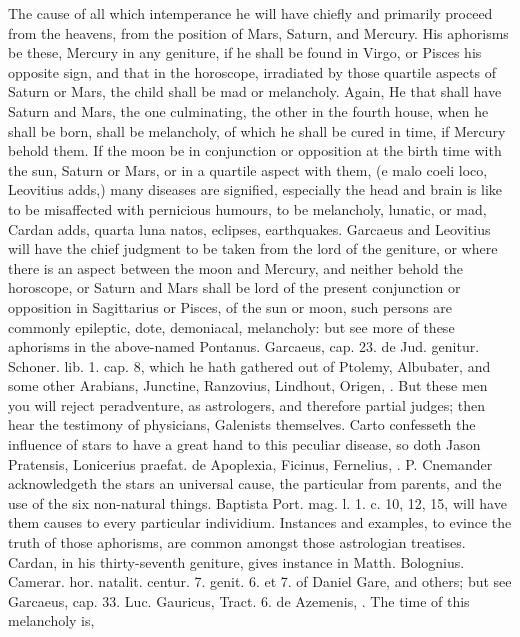 {The cause of all which intemperance he will have chiefly and primarily proceed
from the heavens, from the position of Mars, Saturn, and Mercury.
His aphorisms be these, Mercury in any geniture, if he shall be
found in Virgo, or Pisces his opposite sign, and that in the horoscope,
irradiated by those quartile aspects of Saturn or Mars, the child shall
be mad or melancholy. Again, He that shall have Saturn and Mars,
the one culminating, the other in the fourth house, when he shall be
born, shall be melancholy, of which he shall be cured in time, if
Mercury behold them. If the moon be in conjunction or opposition
at the birth time with the sun, Saturn or Mars, or in a quartile aspect
with them, (e malo coeli loco, Leovitius adds,) many diseases are
signified, especially the head and brain is like to be misaffected with
pernicious humours, to be melancholy, lunatic, or mad, Cardan adds,
quarta luna natos, eclipses, earthquakes. Garcaeus and Leovitius will
have the chief judgment to be taken from the lord of the geniture, or
where there is an aspect between the moon and Mercury, and neither
behold the horoscope, or Saturn and Mars shall be lord of the present
conjunction or opposition in Sagittarius or Pisces, of the sun or moon,
such persons are commonly epileptic, dote, demoniacal, melancholy: but
see more of these aphorisms in the above-named Pontanus. Garcaeus, cap.
23. de Jud. genitur. Schoner. lib. 1. cap. 8, which he hath gathered
out of Ptolemy, Albubater, and some other Arabians, Junctine,
Ranzovius, Lindhout, Origen, \etc{}. But these men you will reject
peradventure, as astrologers, and therefore partial judges; then hear
the testimony of physicians, Galenists themselves. Carto
confesseth the influence of stars to have a great hand to this peculiar
disease, so doth Jason Pratensis, Lonicerius praefat. de Apoplexia,
Ficinus, Fernelius, \etc{}. P. Cnemander acknowledgeth the stars an
universal cause, the particular from parents, and the use of the six
non-natural things. Baptista Port. mag. l. 1. c. 10, 12, 15, will have
them causes to every particular individium. Instances and examples, to
evince the truth of those aphorisms, are common amongst those
astrologian treatises. Cardan, in his thirty-seventh geniture, gives
instance in Matth. Bolognius. Camerar. hor. natalit. centur. 7. genit.
6. et 7. of Daniel Gare, and others; but see Garcaeus, cap. 33. Luc.
Gauricus, Tract. 6. de Azemenis, \etc{}. The time of this melancholy is,
}
